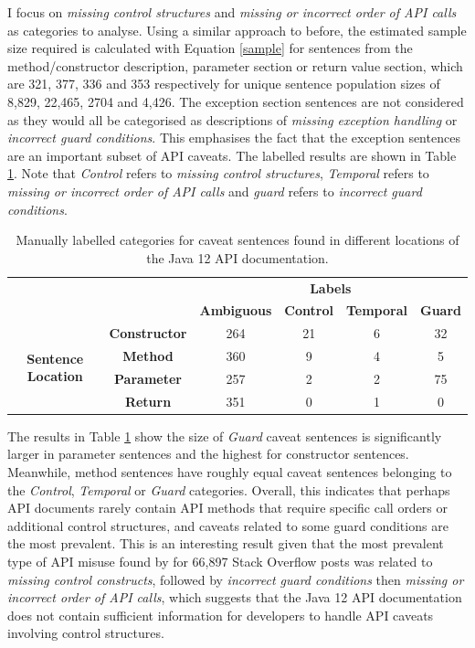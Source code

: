 I focus on \textit{missing control structures} and \textit{missing or incorrect order of API calls} as categories to analyse. Using a similar approach to before, the estimated sample size required is calculated with Equation \ref{sample} for sentences from the method/constructor description, parameter section or return value section, which are 321, 377, 336 and 353 respectively for unique sentence population sizes of 8,829, 22,465, 2704 and 4,426. The exception section sentences are not considered as they would all be categorised as descriptions of \textit{missing exception handling} or \textit{incorrect guard conditions}. This emphasises the fact that the exception sentences are an important subset of API caveats. The labelled results are shown in Table \ref{tab:caveat-sent-stats}. Note that \textit{Control} refers to \textit{missing control structures}, \textit{Temporal} refers to \textit{missing or incorrect order of API calls} and \textit{guard} refers to \textit{incorrect guard conditions}.\\

\begin{table}[h]
	\begin{tabular}{|cc|cccc|}
		\hline
		&  & \multicolumn{4}{c|}{\textbf{Labels}} \\ \cline{3-6} 
		&  & \textbf{Ambiguous} & \textbf{Control} & \textbf{Temporal} & \textbf{Guard} \\ \hline
		\multicolumn{1}{|c|}{\multirow{4}{*}{\textbf{Sentence Location}}} & \textbf{Constructor} & 264 & 21 & 6 & 32 \\ \cline{2-6} 
		\multicolumn{1}{|c|}{} & \textbf{Method} & 360 & 9 & 4 & 5 \\ \cline{2-6} 
		\multicolumn{1}{|c|}{} & \textbf{Parameter} & 257 & 2 & 2 & 75 \\ \cline{2-6} 
		\multicolumn{1}{|c|}{} & \textbf{Return} & 351 & 0 & 1 & 0 \\ \hline
	\end{tabular}
	\caption{Manually labelled categories for caveat sentences found in different locations of the Java 12 API documentation.}
	\label{tab:caveat-sent-stats}
\end{table}

The results in Table \ref{tab:caveat-sent-stats} show the size of \textit{Guard} caveat sentences is significantly larger in parameter sentences and the highest for constructor sentences. Meanwhile, method sentences have roughly equal caveat sentences belonging to the \textit{Control}, \textit{Temporal} or \textit{Guard} categories. Overall, this indicates that perhaps API documents rarely contain API methods that require specific call orders or additional control structures, and caveats related to some guard conditions are the most prevalent. This is an interesting result given that the most prevalent type of API misuse found by \cite{code-examples} for 66,897 Stack Overflow posts was related to \textit{missing control constructs}, followed by \textit{incorrect guard conditions} then \textit{missing or incorrect order of API calls}, which suggests that the Java 12 API documentation does not contain sufficient information for developers to handle API caveats involving control structures.


